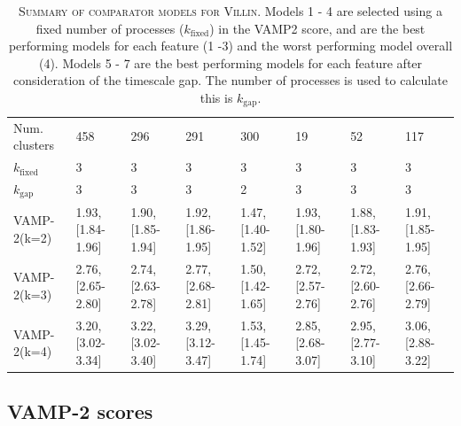 \documentclass{article}
\begin{document}
\begin{landscape}
\begin{table}
\begin{tabular}{llllllll}
Num. clusters                  &                458 &                296 &                291 &                300 &                 19 &                 52 &                117 \\
$k_{\mathrm{fixed}}$           &                  3 &                  3 &                  3 &                  3 &                  3 &                  3 &                  3 \\
$k_{\mathrm{gap}}$             &                  3 &                  3 &                  3 &                  2 &                  3 &                  3 &                  3 \\
VAMP-2(k=2)                    &  1.93, [1.84-1.96] &  1.90, [1.85-1.94] &  1.92, [1.86-1.95] &  1.47, [1.40-1.52] &  1.93, [1.80-1.96] &  1.88, [1.83-1.93] &  1.91, [1.85-1.95] \\
VAMP-2(k=3)                    &  2.76, [2.65-2.80] &  2.74, [2.63-2.78] &  2.77, [2.68-2.81] &  1.50, [1.42-1.65] &  2.72, [2.57-2.76] &  2.72, [2.60-2.76] &  2.76, [2.66-2.79] \\
VAMP-2(k=4)                    &  3.20, [3.02-3.34] &  3.22, [3.02-3.40] &  3.29, [3.12-3.47] &  1.53, [1.45-1.74] &  2.85, [2.68-3.07] &  2.95, [2.77-3.10] &  3.06, [2.88-3.22] \\
\bottomrule
\end{tabular}

\caption{\textsc{Summary of comparator models for Villin.} Models 1 - 4 are selected using a fixed number of processes ($k_{\mathrm{fixed}}$) in the VAMP2 score, and are the best performing models for each feature (1 -3) and the worst performing model overall (4).  Models 5 - 7 are the best performing models for each feature after consideration of the timescale gap. The number of processes is used to calculate this is $k_{\mathrm{gap}}$.}
\label{tab:2f4k_mod_defs}
\end{table}
\end{landscape}

\clearpage
\subsection{VAMP-2 scores}
\end{document}
